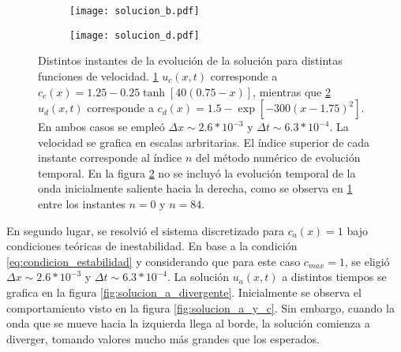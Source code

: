 \documentclass[aps,prb,twocolumn,superscriptaddress,floatfix,longbibliography,10pt]{revtex4-2}
\newcounter{para}
\begin{document}
\begin{figure}
  \centering
  \begin{subfigure}[b]{0.45\textwidth}
    \centering
    \texttt{[image: solucion\_b.pdf]}
    \caption{\label{fig:solucion_b}}
  \end{subfigure}
  \begin{subfigure}[b]{0.45\textwidth}
    \centering
    \texttt{[image: solucion\_d.pdf]}
    \caption{\label{fig:solucion_d}}
  \end{subfigure}
    \caption{Distintos instantes de la evolución de la solución para distintas funciones de velocidad. \ref{fig:solucion_b} $u_c(x,t)$ corresponde a $c_c(x) = 1.25 -0.25 \tanh{[40(0.75-x)]}$, mientras que \ref{fig:solucion_d} $u_d(x,t)$ corresponde a $c_d(x) = 1.5 - \exp{[-300(x-1.75)^2]}$. En ambos casos se empleó $\Delta x \sim 2.6*10^{-3}$ y $\Delta t \sim 6.3*10^{-4}$. La velocidad se grafica en escalas arbritarias. El índice superior de cada instante corresponde al índice $n$ del método numérico de evolución temporal. En la figura \ref{fig:solucion_d} no se incluyó la evolución temporal de la onda inicialmente saliente hacia la derecha, como se observa en \ref{fig:solucion_b} entre los instantes $n=0$ y $n=84$.}
    \label{fig:soluciones_b_y_d}
\end{figure}

En segundo lugar, se resolvió el sistema discretizado para $c_a(x) = 1$ bajo condiciones teóricas de inestabilidad. En base a la condición \ref{eq:condicion_estabilidad} y considerando que para este caso $c_{max} = 1$, se eligió $\Delta x \sim 2.6*10^{-3}$ y $\Delta t \sim 6.3*10^{-4}$. La solución $u_a(x,t)$ a distintos tiempos se grafica en la figura \ref{fig:solucion_a_divergente}. Inicialmente se observa el comportamiento visto en la figura \ref{fig:solucion_a_y_c}. Sin embargo, cuando la onda que se mueve hacia la izquierda llega al borde, la solución comienza a diverger, tomando valores mucho más grandes que los esperados.


\end{document}
